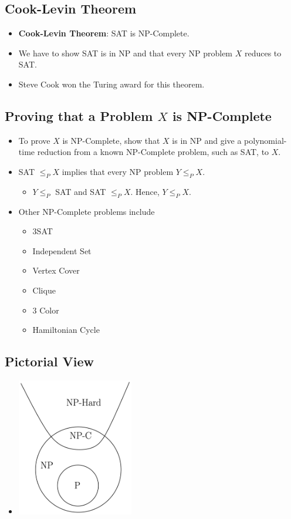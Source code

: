 \subsection{Cook-Levin Theorem}
\begin{itemize}
    \item \textbf{Cook-Levin Theorem}: SAT is NP-Complete.
    \item We have to show SAT is in NP and that every NP problem $X$ reduces to SAT.
    \item Steve Cook won the Turing award for this theorem.
\end{itemize}

\subsection{Proving that a Problem $X$ is NP-Complete}
\begin{itemize}
    \item To prove $X$ is NP-Complete, show that $X$ is in NP and give a polynomial-time reduction from a known NP-Complete problem, such as SAT, to $X$.
    \item SAT $\leq_P X$ implies that every NP problem $Y \leq_P X$.
    \begin{itemize}
        \item $Y \leq_P$ SAT and SAT $\leq _P X$. Hence, $Y \leq_P X$.
    \end{itemize}
    \item Other NP-Complete problems include
    \begin{itemize}
        \item 3SAT
        \item Independent Set
        \item Vertex Cover
        \item Clique
        \item 3 Color
        \item Hamiltonian Cycle
    \end{itemize}
\end{itemize}

\subsection{Pictorial View}
\begin{itemize}
    \item[] \begin{center}
        \includegraphics[width=0.4\textwidth]{lecture23/images/p-np-complete-hard-diagram.jpg}
    \end{center}
\end{itemize}

